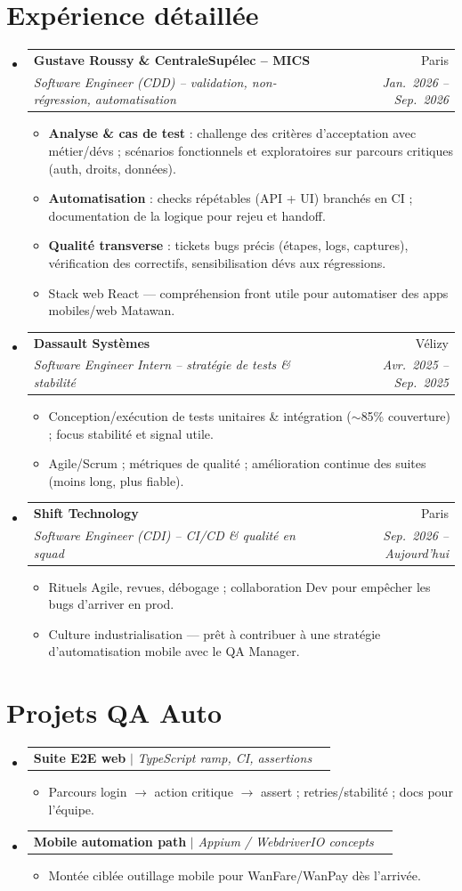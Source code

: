 \documentclass[a4paper,10.5pt]{article}
\makeatletter
\newcommand{\resumeItem}[1]{\item\small{#1}}
\newcommand{\resumeSubheading}[4]{\vspace{2.5pt}\item\begin{tabular*}{0.97\textwidth}[t]{l@{\extracolsep{\fill}}r}\textbf{#1}&{#2}\\\textit{\small #3}&\textit{\small #4}\\\end{tabular*}\vspace{1pt}}
\newcommand{\resumeProjectHeading}[2]{\vspace{1.5pt}\item\begin{tabular*}{0.97\textwidth}{l@{\extracolsep{\fill}}r}\small #1&#2\\\end{tabular*}\vspace{1pt}}
\newcommand{\resumeSubHeadingListStart}{\begin{itemize}[leftmargin=0.08in,label={}]}
\newcommand{\resumeSubHeadingListEnd}{\end{itemize}}
\makeatother
\begin{document}
\section{Exp\'erience d\'etaill\'ee}
\resumeSubHeadingListStart
  \resumeSubheading
    {Gustave Roussy \& CentraleSup\'elec -- MICS}{Paris}
    {Software Engineer (CDD) -- validation, non-r\'egression, automatisation}{Jan.~2026 -- Sep.~2026}
    \begin{itemize}
      \resumeItem{\textbf{Analyse \& cas de test} : challenge des crit\`eres d'acceptation avec m\'etier/d\'evs ; sc\'enarios fonctionnels et exploratoires sur parcours critiques (auth, droits, donn\'ees).}
      \resumeItem{\textbf{Automatisation} : checks r\'ep\'etables (API + UI) branch\'es en CI ; documentation de la logique pour rejeu et handoff.}
      \resumeItem{\textbf{Qualit\'e transverse} : tickets bugs pr\'ecis (\'etapes, logs, captures), v\'erification des correctifs, sensibilisation d\'evs aux r\'egressions.}
      \resumeItem{Stack web React --- compr\'ehension front utile pour automatiser des apps mobiles/web Matawan.}
    \end{itemize}
  \resumeSubheading
    {Dassault Syst\`emes}{V\'elizy}
    {Software Engineer Intern -- strat\'egie de tests \& stabilit\'e}{Avr.~2025 -- Sep.~2025}
    \begin{itemize}
      \resumeItem{Conception/ex\'ecution de tests unitaires \& int\'egration ($\sim$85\% couverture) ; focus stabilit\'e et signal utile.}
      \resumeItem{Agile/Scrum ; m\'etriques de qualit\'e ; am\'elioration continue des suites (moins long, plus fiable).}
    \end{itemize}
  \resumeSubheading
    {Shift Technology}{Paris}
    {Software Engineer (CDI) -- CI/CD \& qualit\'e en squad}{Sep.~2026 -- Aujourd'hui}
    \begin{itemize}
      \resumeItem{Rituels Agile, revues, d\'ebogage ; collaboration Dev pour emp\^echer les bugs d'arriver en prod.}
      \resumeItem{Culture industrialisation --- pr\^et \`a contribuer \`a une strat\'egie d'automatisation mobile avec le QA Manager.}
    \end{itemize}
\resumeSubHeadingListEnd

\section{Projets QA Auto}
\resumeSubHeadingListStart
  \resumeProjectHeading{\textbf{Suite E2E web} $|$ \emph{TypeScript ramp, CI, assertions}}{}
  \begin{itemize}\resumeItem{Parcours login $\rightarrow$ action critique $\rightarrow$ assert ; retries/stabilit\'e ; docs pour l'\'equipe.}\end{itemize}
  \resumeProjectHeading{\textbf{Mobile automation path} $|$ \emph{Appium / WebdriverIO concepts}}{}
  \begin{itemize}\resumeItem{Mont\'ee cibl\'ee outillage mobile pour WanFare/WanPay d\`es l'arriv\'ee.}\end{itemize}
\resumeSubHeadingListEnd
\end{document}
